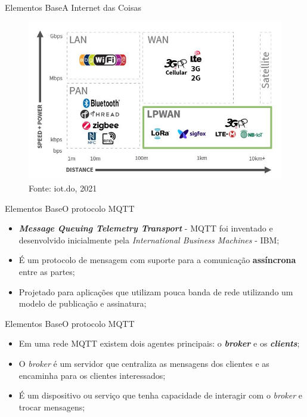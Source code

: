 \begin{frame}{Elementos Base}{A Internet das Coisas}

    \begin{figure}
        \centering
        \caption{Protocolos utilizados para aplicacão do \textit{IoT} com base nos conceitos de redes. Relação entre velocidade-força e distância.}
        \includegraphics[width=0.6\linewidth]{figuras/iotprotocols.jpg}
        \caption*{\small{Fonte: iot.do, 2021}}
    \end{figure}   

\end{frame}


\begin{frame}{Elementos Base}{O protocolo MQTT}

    \begin{itemize}
        \item \textbf{\textit{Message Queuing Telemetry Transport}} - MQTT foi inventado e desenvolvido inicialmente pela \textit{International Business Machines} - IBM;
        \item É um protocolo de mensagem com suporte para a comunicação \textbf{assíncrona} entre as partes;
        \item Projetado para aplicações que utilizam pouca banda de rede utilizando um modelo de publicação e assinatura;

    \end{itemize}


\end{frame}

\begin{frame}{Elementos Base}{O protocolo MQTT}

    \begin{itemize}
        \item Em uma rede MQTT existem dois agentes principais: o \textit{\textbf{broker}} e os \textit{\textbf{clients}};
        \item O \textit{broker} é um servidor que centraliza as mensagens dos clientes e as encaminha para os clientes interessados;
        \item É um dispositivo ou serviço que tenha capacidade de interagir com o \textit{broker} e trocar mensagens;

    \end{itemize}


\end{frame}


